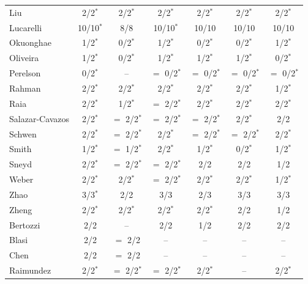 \begin{longtable}{@{}lcccccc@{}}
Liu & 2/2$^{\ast}$ & 2/2$^{\ast}$ & 2/2$^{\ast}$ & 2/2$^{\ast}$ & 2/2$^{\ast}$ & 2/2$^{\ast}$ \\
Lucarelli & 10/10$^{\ast}$ & 8/8 & 10/10$^{\ast}$ & 10/10 & 10/10 & 10/10 \\
Okuonghae & 1/2$^{\ast}$ & 0/2$^{\ast}$ & 1/2$^{\ast}$ & 0/2$^{\ast}$ & 0/2$^{\ast}$ & 1/2$^{\ast}$ \\
Oliveira & 1/2$^{\ast}$ & 0/2$^{\ast}$ & 1/2$^{\ast}$ & 1/2$^{\ast}$ & 1/2$^{\ast}$ & 0/2$^{\ast}$ \\
Perelson & 0/2$^{\ast}$ & -- & $=$ 0/2$^{\ast}$ & $=$ 0/2$^{\ast}$ & $=$ 0/2$^{\ast}$ & $=$ 0/2$^{\ast}$ \\
Rahman & 2/2$^{\ast}$ & 2/2$^{\ast}$ & 2/2$^{\ast}$ & 2/2$^{\ast}$ & 2/2$^{\ast}$ & 1/2$^{\ast}$ \\
Raia & 2/2$^{\ast}$ & 1/2$^{\ast}$ & $=$ 2/2$^{\ast}$ & 2/2$^{\ast}$ & 2/2$^{\ast}$ & 2/2$^{\ast}$ \\
Salazar-Cavazos & 2/2$^{\ast}$ & $=$ 2/2$^{\ast}$ & $=$ 2/2$^{\ast}$ & $=$ 2/2$^{\ast}$ & 2/2$^{\ast}$ & 2/2 \\
Schwen & 2/2$^{\ast}$ & $=$ 2/2$^{\ast}$ & 2/2$^{\ast}$ & $=$ 2/2$^{\ast}$ & $=$ 2/2$^{\ast}$ & 2/2$^{\ast}$ \\
Smith & 1/2$^{\ast}$ & $=$ 1/2$^{\ast}$ & 2/2$^{\ast}$ & 1/2$^{\ast}$ & 0/2$^{\ast}$ & 1/2$^{\ast}$ \\
Sneyd & 2/2$^{\ast}$ & $=$ 2/2$^{\ast}$ & $=$ 2/2$^{\ast}$ & 2/2 & 2/2 & 1/2 \\
Weber & 2/2$^{\ast}$ & 2/2$^{\ast}$ & $=$ 2/2$^{\ast}$ & 2/2$^{\ast}$ & 2/2$^{\ast}$ & 1/2$^{\ast}$ \\
Zhao & 3/3$^{\ast}$ & 2/2 & 3/3 & 2/3 & 3/3 & 3/3 \\
Zheng & 2/2$^{\ast}$ & 2/2$^{\ast}$ & 2/2$^{\ast}$ & 2/2$^{\ast}$ & 2/2 & 1/2 \\
\midrule
Bertozzi & 2/2 & -- & 2/2 & 1/2 & 2/2 & 2/2 \\
Blasi & 2/2 & $=$ 2/2 & -- & -- & -- & -- \\
Chen & 2/2 & $=$ 2/2 & -- & -- & -- & -- \\
Raimundez & 2/2$^{\ast}$ & $=$ 2/2$^{\ast}$ & $=$ 2/2$^{\ast}$ & 2/2$^{\ast}$ & -- & 2/2$^{\ast}$ \\
\bottomrule
\end{longtable}
